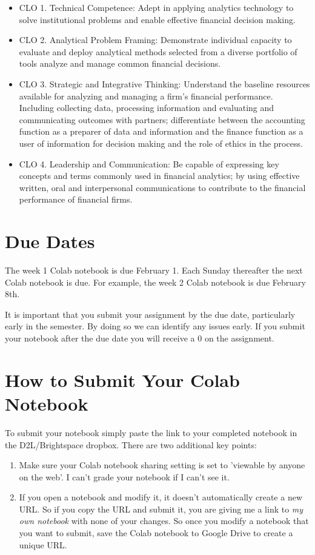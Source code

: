 \documentclass[11pt]{article}
\begin{document}
\begin{itemize}
\item CLO 1. Technical Competence: Adept in applying analytics technology to solve institutional problems and enable effective financial decision making.
\item CLO 2. Analytical Problem Framing: Demonstrate individual capacity to evaluate and deploy analytical methods selected from a diverse portfolio of tools analyze and manage common financial decisions.
\item CLO 3. Strategic and Integrative Thinking: Understand the baseline resources available for analyzing and managing a firm’s financial performance. Including collecting data, processing information and evaluating and communicating outcomes with partners; differentiate between the accounting function as a preparer of data and information and the finance function as a user of information for decision making and the role of ethics in the process.
\item CLO 4. Leadership and Communication: Be capable of expressing key concepts and terms commonly used in financial analytics; by using effective written, oral and interpersonal communications to contribute to the financial performance of financial firms.
\end{itemize}
\section{Due Dates}
\label{sec:orgacaee6b}

The week 1 Colab notebook is due February 1.  Each Sunday thereafter the next Colab notebook is due.  For example, the week 2 Colab notebook is due February 8th.

It is important that you submit your assignment by the due date, particularly early in the semester.  By doing so we can identify any issues early.  If you submit your notebook after the due date you will receive a 0 on the assignment.
\section{How to Submit Your Colab Notebook}
\label{sec:org9ab71a1}

To submit your notebook simply paste the link to your completed notebook in the D2L/Brightspace dropbox.  There are two additional key points:

\begin{enumerate}
\item Make sure your Colab notebook sharing setting is set to 'viewable by anyone on the web'.  I can't grade your notebook if I can't see it.
\item If you open a notebook and modify it, it doesn't automatically create a new URL.  So if you copy the URL and submit it, you are giving me a link to \emph{my own notebook} with none of your changes. So once you modify a notebook that you want to submit, save the Colab notebook to Google Drive to create a unique URL.
\end{enumerate}
\end{document}
